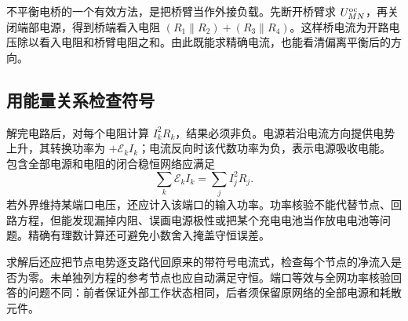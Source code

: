 不平衡电桥的一个有效方法，是把桥臂当作外接负载。先断开桥臂求 $U_{MN}^{\rm oc}$，再关闭端部电源，得到桥端看入电阻 $(R_1\parallel R_2)+(R_3\parallel R_4)$。这样桥电流为开路电压除以看入电阻和桥臂电阻之和。由此既能求精确电流，也能看清偏离平衡后的方向。

\subsection{用能量关系检查符号}

解完电路后，对每个电阻计算 $I_k^2R_k$，结果必须非负。电源若沿电流方向提供电势上升，其转换功率为 $+\mathcal E_k I_k$；电流反向时该代数功率为负，表示电源吸收电能。包含全部电源和电阻的闭合稳恒网络应满足
\[
 \sum_k\mathcal E_k I_k=\sum_j I_j^2R_j.
\]
若外界维持某端口电压，还应计入该端口的输入功率。功率核验不能代替节点、回路方程，但能发现漏掉内阻、误画电源极性或把某个充电电池当作放电电池等问题。精确有理数计算还可避免小数舍入掩盖守恒误差。



求解后还应把节点电势逐支路代回原来的带符号电流式，检查每个节点的净流入是否为零。未单独列方程的参考节点也应自动满足守恒。端口等效与全网功率核验回答的问题不同：前者保证外部工作状态相同，后者须保留原网络的全部电源和耗散元件。
